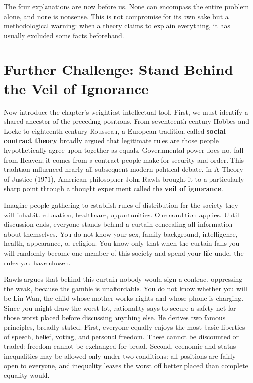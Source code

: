 The four explanations are now before us. None can encompass the entire problem alone, and none is nonsense. This is not compromise for its own sake but a methodological warning: when a theory claims to explain everything, it has usually excluded some facts beforehand.

\section[Behind the Veil of Ignorance]{Further Challenge: Stand Behind the Veil of Ignorance}
Now introduce the chapter's weightiest intellectual tool. First, we must identify a shared ancestor of the preceding positions. From seventeenth-century Hobbes and Locke to eighteenth-century Rousseau, a European tradition called \textbf{social contract theory} broadly argued that legitimate rules are those people hypothetically agree upon together as equals. Governmental power does not fall from Heaven; it comes from a contract people make for security and order. This tradition influenced nearly all subsequent modern political debate. In A Theory of Justice (1971), American philosopher John Rawls brought it to a particularly sharp point through a thought experiment called the \textbf{veil of ignorance}.

Imagine people gathering to establish rules of distribution for the society they will inhabit: education, healthcare, opportunities. One condition applies. Until discussion ends, everyone stands behind a curtain concealing all information about themselves. You do not know your sex, family background, intelligence, health, appearance, or religion. You know only that when the curtain falls you will randomly become one member of this society and spend your life under the rules you have chosen.

Rawls argues that behind this curtain nobody would sign a contract oppressing the weak, because the gamble is unaffordable. You do not know whether you will be Lin Wan, the child whose mother works nights and whose phone is charging. Since you might draw the worst lot, rationality says to secure a safety net for those worst placed before discussing anything else. He derives two famous principles, broadly stated. First, everyone equally enjoys the most basic liberties of speech, belief, voting, and personal freedom. These cannot be discounted or traded: freedom cannot be exchanged for bread. Second, economic and status inequalities may be allowed only under two conditions: all positions are fairly open to everyone, and inequality leaves the worst off better placed than complete equality would.


